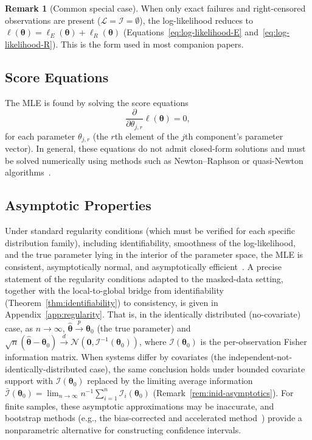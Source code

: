 \documentclass[11pt]{article}
\theoremstyle{definition}
\newtheorem{remark}{Remark}
\theoremstyle{plain}
\renewcommand{\v}[1]{\boldsymbol{#1}}
\newcommand{\btheta}{\v{\theta}}
\begin{document}
\begin{remark}[Common special case]
\label{rem:common-case}
When only exact failures and right-censored observations are present
($\mathcal{L} = \mathcal{I} = \emptyset$), the log-likelihood reduces to
$\ell(\btheta) = \ell_E(\btheta) + \ell_R(\btheta)$
(Equations~\eqref{eq:log-likelihood-E}
and~\eqref{eq:log-likelihood-R}).
This is the form used in most companion papers.
\end{remark}

\subsection{Score Equations}
\label{sec:score-equations}

The MLE is found by solving the score equations
\begin{equation}
\label{eq:score}
    \frac{\partial}{\partial \theta_{j,r}} \ell(\btheta) = 0,
\end{equation}
for each parameter $\theta_{j,r}$ (the $r$th element of the $j$th
component's parameter vector).
In general, these equations do not admit closed-form solutions and must
be solved numerically using methods such as Newton--Raphson or
quasi-Newton algorithms~\citep{nocedal2006numerical,byrd1995}.

\subsection{Asymptotic Properties}
\label{sec:asymptotic-properties}

Under standard regularity conditions (which must be verified for each
specific distribution family), including identifiability, smoothness
of the log-likelihood, and the true parameter lying in the interior
of the parameter space, the MLE is consistent, asymptotically normal,
and asymptotically
efficient~\citep{casella2002statistical,lehmann1998theory,vandervaart1998asymptotic}.
A precise statement of the regularity conditions adapted to the
masked-data setting, together with the local-to-global bridge from
identifiability (Theorem~\ref{thm:identifiability}) to consistency,
is given in Appendix~\ref{app:regularity}.
That is, in the identically distributed (no-covariate) case, as
$n \to \infty$,
$\hat{\btheta} \xrightarrow{p} \btheta_0$ (the true parameter) and
$\sqrt{n}(\hat{\btheta} - \btheta_0) \xrightarrow{d}
\mathcal{N}(\v{0}, \mathcal{I}^{-1}(\btheta_0))$,
where $\mathcal{I}(\btheta_0)$ is the per-observation Fisher information matrix.
When systems differ by covariates (the independent-not-identically-distributed
case), the same conclusion holds under bounded covariate support with
$\mathcal{I}(\btheta_0)$ replaced by the limiting average information
$\bar{\mathcal{I}}(\btheta_0) = \lim_{n \to \infty} n^{-1} \sum_{i=1}^n
\mathcal{I}_i(\btheta_0)$ (Remark~\ref{rem:inid-asymptotics}).
For finite samples, these asymptotic approximations may be inaccurate,
and bootstrap methods (e.g., the bias-corrected and accelerated
method~\citep{efron1987better,efron1994introduction}) provide a
nonparametric alternative for constructing confidence intervals.
\end{document}
